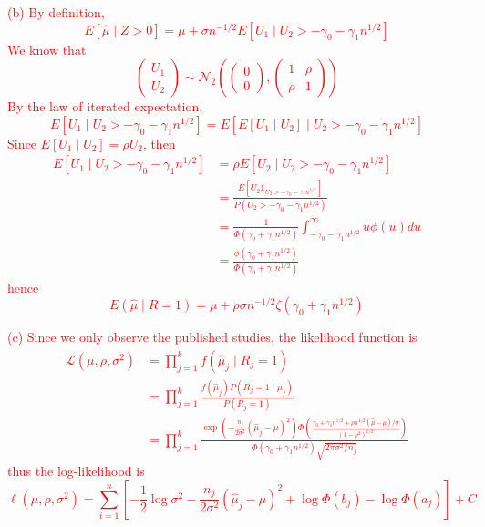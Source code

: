 \documentclass[12pt]{article}
\newcommand{\1}{\mathds 1}
\begin{document}
\begin{enumerate}
\textcolor{red}{
(b) By definition, 
\begin{equation*}
	E[\hat\mu \mid Z > 0] = \mu + \sigma n^{-1/2} E[U_1 \mid U_2 > -\gamma_0 - \gamma_1n^{1/2}]
\end{equation*}
We know that 
\begin{equation*}
	\begin{pmatrix}
		U_1 \\ U_2
	\end{pmatrix} \sim \mathcal N_2\left(\begin{pmatrix}
		0 \\ 0
	\end{pmatrix}, \begin{pmatrix}
		1 & \rho \\ \rho & 1
	\end{pmatrix}\right)
\end{equation*}
By the law of iterated expectation, 
\begin{equation*}
	E[U_1 \mid U_2 > -\gamma_0 - \gamma_1 n^{1/2}] = E[E[U_1 \mid U_2] \mid U_2 > -\gamma_0 - \gamma_1 n^{1/2}]
\end{equation*}
Since $E[U_1 \mid U_2] = \rho U_2$, then 
\begin{align*}
	E[U_1 \mid U_2 >  -\gamma_0 - \gamma_1 n^{1/2}] &= \rho E[U_2 \mid U_2 >  -\gamma_0 - \gamma_1 n^{1/2}] \\
	&= \frac{E[U_2 \1_{U_2 >  -\gamma_0 - \gamma_1 n^{1/2}}]}{P(U_2 >  -\gamma_0 - \gamma_1 n^{1/2})}\\
	&= \frac{1}{\Phi(\gamma_0 + \gamma_1 n^{1/2})} \int_{ -\gamma_0 - \gamma_1 n^{1/2}}^{\infty} u\phi(u) du\\
	&= \frac{\phi(\gamma_0 + \gamma_1 n^{1/2})}{\Phi( \gamma_0 + \gamma_1 n^{1/2})}
\end{align*}
hence 
\begin{equation*}
	E(\hat \mu \mid R = 1) = \mu + \rho\sigma n^{-1/2} \zeta(\gamma_0 + \gamma_1 n^{1/2})
\end{equation*}
}

\textcolor{red}{
(c) Since we only observe the published studies, the likelihood function is 
\begin{align*}
	\mathcal L(\mu, \rho, \sigma^2) &= \prod_{j=1}^k f(\hat \mu_j  \mid R_j = 1)\\
	&= \prod_{j=1}^k \frac{f(\hat\mu_j) P(R_j = 1 \mid \mu_j)}{P(R_j = 1)}\\\
	&= \prod_{j=1}^k \frac{\exp\left(-\frac{n_j}{2\sigma^2}(\hat\mu_j - \mu)^2\right)\Phi\left(\frac{\gamma_0 + \gamma_1 n^{1/2} + \rho n^{1/2} (\hat\mu - \mu)/\sigma}{(1 - \rho^2)^{1/2}}\right)}{\Phi(\gamma_0 + \gamma_1 n^{1/2})\sqrt{2\pi \sigma^2/n_j}}
\end{align*}
thus the log-likelihood is
\begin{equation*}
	\ell(\mu, \rho, \sigma^2) = \sum_{i=1}^n \left[-\frac 12 \log \sigma^2 - \frac{n_j}{2\sigma^2}(\hat\mu_j - \mu)^2 + \log \Phi(b_j) - \log \Phi(a_j)\right] + C
\end{equation*}
}


\end{enumerate}
\end{document}
